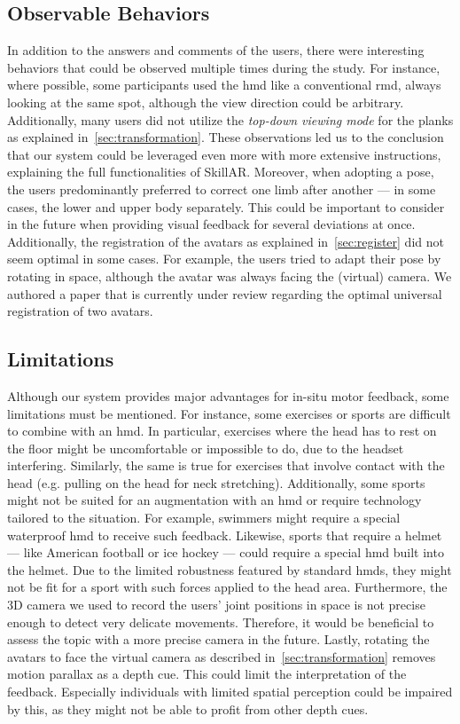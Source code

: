 \subsection{Observable Behaviors \label{sec:behaviors}}
In addition to the answers and comments of the users, there were interesting behaviors that could be observed multiple times during the study. For instance, where possible, some participants used the \acrshort{hmd} like a conventional \acrshort{rmd}, always looking at the same spot, although the view direction could be arbitrary. Additionally, many users did not utilize the \emph{top-down viewing mode} for the planks as explained in~\autoref{sec:transformation}. These observations led us to the conclusion that our system could be leveraged even more with more extensive instructions, explaining the full functionalities of SkillAR. Moreover, when adopting a pose, the users predominantly preferred to correct one limb after another --- in some cases, the lower and upper body separately. This could be important to consider in the future when providing visual feedback for several deviations at once. Additionally, the registration of the avatars as explained in~\autoref{sec:register} did not seem optimal in some cases. For example, the users tried to adapt their pose by rotating in space, although the avatar was always facing the (virtual) camera. We authored a paper that is currently under review regarding the optimal universal registration of two avatars.

\subsection{Limitations}
Although our system provides major advantages for in-situ motor feedback, some limitations must be mentioned. For instance, some exercises or sports are difficult to combine with an \acrshort{hmd}. In particular, exercises where the head has to rest on the floor might be uncomfortable or impossible to do, due to the headset interfering. Similarly, the same is true for exercises that involve contact with the head (e.g. pulling on the head for neck stretching). Additionally, some sports might not be suited for an augmentation with an \acrshort{hmd} or require technology tailored to the situation. For example, swimmers might require a special waterproof \acrshort{hmd} to receive such feedback. Likewise, sports that require a helmet --- like American football or ice hockey --- could require a special \acrshort{hmd} built into the helmet. Due to the limited robustness featured by standard \acrshort{hmd}s, they might not be fit for a sport with such forces applied to the head area. Furthermore, the 3D camera we used to record the users' joint positions in space is not precise enough to detect very delicate movements. Therefore, it would be beneficial to assess the topic with a more precise camera in the future. Lastly, rotating the avatars to face the virtual camera as described in~\autoref{sec:transformation} removes motion parallax as a depth cue. This could limit the interpretation of the feedback. Especially individuals with limited spatial perception could be impaired by this, as they might not be able to profit from other depth cues.

